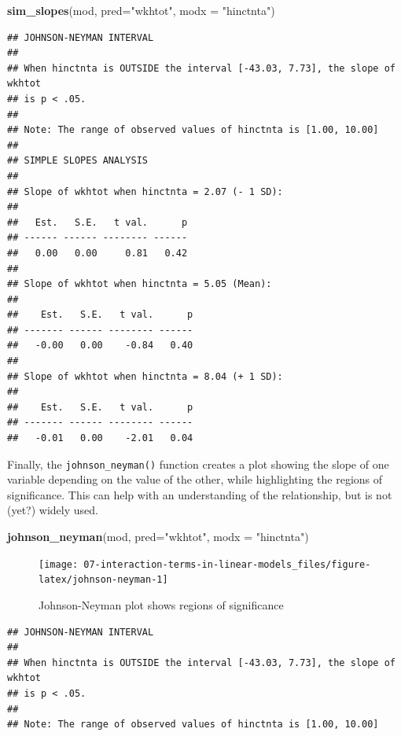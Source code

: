 \documentclass[
]{book}
\newenvironment{Shaded}{\begin{snugshade}}{\end{snugshade}}
\newcommand{\DataTypeTok}[1]{\textcolor[rgb]{0.13,0.29,0.53}{#1}}
\newcommand{\KeywordTok}[1]{\textcolor[rgb]{0.13,0.29,0.53}{\textbf{#1}}}
\newcommand{\NormalTok}[1]{#1}
\newcommand{\StringTok}[1]{\textcolor[rgb]{0.31,0.60,0.02}{#1}}
\begin{document}
\begin{Shaded}
\begin{Highlighting}[]
\KeywordTok{sim_slopes}\NormalTok{(mod, }\DataTypeTok{pred=}\StringTok{"wkhtot"}\NormalTok{, }\DataTypeTok{modx =} \StringTok{"hinctnta"}\NormalTok{)}
\end{Highlighting}
\end{Shaded}

\begin{verbatim}
## JOHNSON-NEYMAN INTERVAL 
## 
## When hinctnta is OUTSIDE the interval [-43.03, 7.73], the slope of wkhtot
## is p < .05.
## 
## Note: The range of observed values of hinctnta is [1.00, 10.00]
## 
## SIMPLE SLOPES ANALYSIS 
## 
## Slope of wkhtot when hinctnta = 2.07 (- 1 SD): 
## 
##   Est.   S.E.   t val.      p
## ------ ------ -------- ------
##   0.00   0.00     0.81   0.42
## 
## Slope of wkhtot when hinctnta = 5.05 (Mean): 
## 
##    Est.   S.E.   t val.      p
## ------- ------ -------- ------
##   -0.00   0.00    -0.84   0.40
## 
## Slope of wkhtot when hinctnta = 8.04 (+ 1 SD): 
## 
##    Est.   S.E.   t val.      p
## ------- ------ -------- ------
##   -0.01   0.00    -2.01   0.04
\end{verbatim}

Finally, the \texttt{johnson\_neyman()} function creates a plot showing the slope of one variable depending on the value of the other, while highlighting the regions of significance. This can help with an understanding of the relationship, but is not (yet?) widely used.

\begin{Shaded}
\begin{Highlighting}[]
\KeywordTok{johnson_neyman}\NormalTok{(mod, }\DataTypeTok{pred=}\StringTok{"wkhtot"}\NormalTok{, }\DataTypeTok{modx =} \StringTok{"hinctnta"}\NormalTok{)}
\end{Highlighting}
\end{Shaded}

\begin{figure}

{\centering \texttt{[image: 07-interaction-terms-in-linear-models\_files/figure-latex/johnson-neyman-1]} 

}

\caption{Johnson-Neyman plot shows regions of significance}\label{fig:johnson-neyman}
\end{figure}

\begin{verbatim}
## JOHNSON-NEYMAN INTERVAL 
## 
## When hinctnta is OUTSIDE the interval [-43.03, 7.73], the slope of wkhtot
## is p < .05.
## 
## Note: The range of observed values of hinctnta is [1.00, 10.00]
\end{verbatim}
\end{document}
